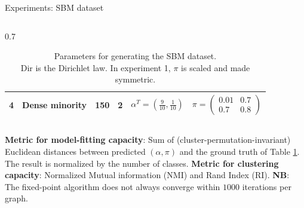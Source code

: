 \documentclass[final]{beamer}
\newlength{\colwidth}
\begin{document}
\begin{frame}[t]
\begin{columns}[t]
\begin{column}{\colwidth}
\begin{block}{Experiments: SBM dataset}
\begin{column}{0.7\colwidth}
\begin{table}[ht]
\begin{tabular}{@{}cccccc@{}}
              4                                       & \multicolumn{1}{c|}{Dense minority}           & \hspace{1em} 150                        & \multicolumn{1}{c|}{2} & $\alpha^T = (\frac{9}{10}, \frac{1}{10})$ & $\pi = \begin{pmatrix} 0.01 & 0.7 \\ 0.7 & 0.8 \end{pmatrix}$ \\ \bottomrule
            \end{tabular}
            \caption{\centering Parameters for generating the SBM dataset. \\ $\text{Dir}$ is the Dirichlet law. In experiment 1, $\pi$ is scaled and made symmetric.}
            \label{tab:sbm_parameters}
          \end{table}
        \end{column}
        \textbf{Metric for model-fitting capacity}: Sum of (cluster-permutation-invariant) Euclidean distances between predicted $(\alpha, \pi)$ and the ground truth of Table \ref{tab:sbm_parameters}. The result is normalized by the number of classes.
        \newline
        \textbf{Metric for clustering capacity}: Normalized Mutual information (NMI) and Rand Index (RI).\newline
        \textbf{NB}: The fixed-point algorithm does not always converge within $1000$ iterations per graph.


\end{block}
\end{column}
\end{columns}
\end{frame}
\end{document}
